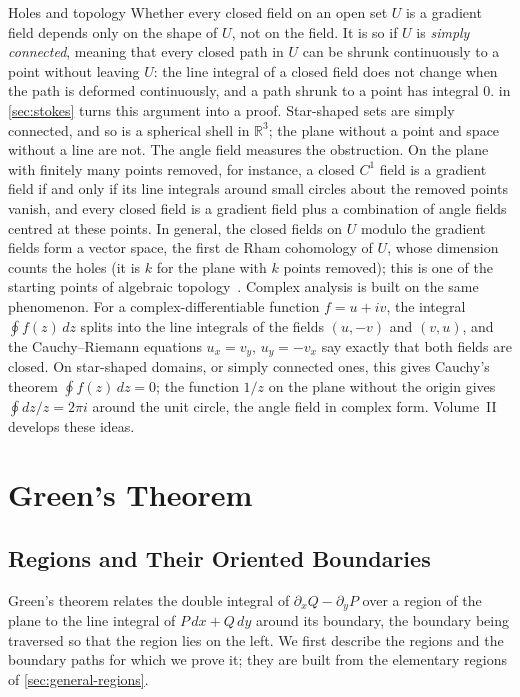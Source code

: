 \begin{note}{Holes and topology}
Whether every closed field on an open set $U$ is a gradient field depends only on the shape of $U$, not on the field. It is so if $U$ is \emph{simply connected}, meaning that every closed path in $U$ can be shrunk continuously to a point without leaving $U$: the line integral of a closed field does not change when the path is deformed continuously, and a path shrunk to a point has integral $0$.  in \cref{sec:stokes} turns this argument into a proof. Star-shaped sets are simply connected, and so is a spherical shell in $\mathbb R^3$; the plane without a point and space without a line are not. The angle field measures the obstruction. On the plane with finitely many points removed, for instance, a closed $C^1$ field is a gradient field if and only if its line integrals around small circles about the removed points vanish, and every closed field is a gradient field plus a combination of angle fields centred at these points. In general, the closed fields on $U$ modulo the gradient fields form a vector space, the first de Rham cohomology of $U$, whose dimension counts the holes (it is $k$ for the plane with $k$ points removed); this is one of the starting points of algebraic topology~\cite{munkres1991}. Complex analysis is built on the same phenomenon. For a complex-differentiable function $f=u+iv$, the integral $\oint f(z)\,dz$ splits into the line integrals of the fields $(u,-v)$ and $(v,u)$, and the Cauchy--Riemann equations $u_x=v_y$, $u_y=-v_x$ say exactly that both fields are closed. On star-shaped domains, or simply connected ones, this gives Cauchy's theorem $\oint f(z)\,dz=0$; the function $1/z$ on the plane without the origin gives $\oint dz/z=2\pi i$ around the unit circle, the angle field in complex form. Volume~II develops these ideas.
\end{note}

\section{Green's Theorem}
\label{sec:green}

\subsection{Regions and Their Oriented Boundaries}

Green's theorem relates the double integral of $\partial_xQ-\partial_yP$ over a region of the plane to the line integral of $P\,dx+Q\,dy$ around its boundary, the boundary being traversed so that the region lies on the left. We first describe the regions and the boundary paths for which we prove it; they are built from the elementary regions of \cref{sec:general-regions}.

